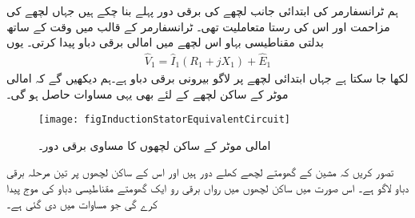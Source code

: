 ہم ٹرانسفارمر کی ابتدائی جانب لچھے کی برقی دور پہلے بنا چکے ہیں جہاں  لچھے کی مزاحمت  اور اس کی رستا متعاملیت   تھی۔ ٹرانسفارمر کے قالب  میں وقت کے ساتھ بدلتی مقناطیسی بہاو اس لچھے میں امالی برقی دباو  پیدا کرتی۔ یوں 
\begin{align}
\hat{V}_1=\hat{I}_1 \left(R_1+j X_1 \right) +\hat{E}_1
\end{align}
لکھا جا سکتا ہے  جہاں  ابتدائی لچھے پر لاگو بیرونی برقی دباو ہے۔ہم دیکھیں گے کہ امالی موٹر کے ساکن لچھے کے لئے بھی یہی مساوات حاصل ہو گی۔
\begin{figure}
\centering
\texttt{[image: figInductionStatorEquivalentCircuit]}
\caption{امالی موٹر کے ساکن لچھوں کا مساوی برقی دور۔}
\label{شکل_امالی_ساکن_لچھوں_کی_مساوی_دور}
\end{figure}

 تصور کریں کہ مشین کے گھومتے لچھے کھلے دور ہیں اور اس کے ساکن لچھوں پر تین مرحلہ برقی دباو لاگو ہے۔ اس صورت میں ساکن لچھوں میں رواں برقی رو ایک گھومتے مقناطیسی دباو کی موج   پیدا کرے گی جو مساوات  میں دی گئی ہے۔

